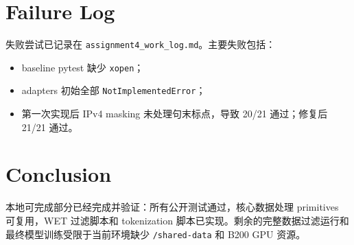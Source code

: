 \documentclass[UTF8,11pt]{ctexart}
\begin{document}
\section{Failure Log}

失败尝试已记录在 \texttt{assignment4\_work\_log.md}。主要失败包括：

\begin{itemize}
  \item baseline pytest 缺少 \texttt{xopen}；
  \item adapters 初始全部 \texttt{NotImplementedError}；
  \item 第一次实现后 IPv4 masking 未处理句末标点，导致 20/21 通过；修复后 21/21 通过。
\end{itemize}

\section{Conclusion}

本地可完成部分已经完成并验证：所有公开测试通过，核心数据处理 primitives 可复用，WET 过滤脚本和 tokenization
脚本已实现。剩余的完整数据过滤运行和最终模型训练受限于当前环境缺少 \texttt{/shared-data} 和 B200 GPU 资源。
\end{document}
